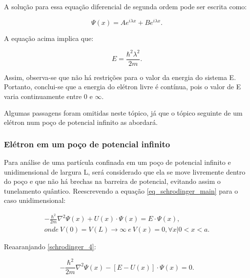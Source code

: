   \par A solução para essa equação diferencial de segunda ordem pode ser escrita como\cite{frustrado7}:

  \begin{equation}
    \label{schrodinger_2}
    \Psi(x) = Ae^{i\lambda x} + Be^{i\lambda x}  .
  \end{equation}

  \par A equação acima implica que:

  \begin{equation}
    \label{schrodinger_3}
    E = \frac{\hbar^2 \lambda^2}{2m}.
  \end{equation}

  \par Assim, observa-se que não há restrições para o valor da energia do sistema E. Portanto, conclui-se que a energia do elétron livre é contínua, pois o valor de E varia continuamente entre $0$ e $\infty$.

  \par Algumas passagens foram omitidas neste tópico, já que o tópico seguinte de um elétron num poço de potencial infinito as abordará. 

\subsubsection{Elétron em um poço de potencial infinito}

  \par Para análise de uma partícula confinada em um poço de potencial infinito e unidimensional de largura L, será considerado que ela se move livremente dentro do poço e que não há brechas na barreira de potencial, evitando assim o tunelamento quântico. Reescrevendo a equação \eqref{eq_schrodinger_main} para o caso unidimensional: 

  \begin{align}\label{schrodinger_4}
      -\frac{\hbar^2}{2m} \nabla^2 \Psi(x) + U(x) \cdot \Psi(x) = E \cdot \Psi(x),\\
      onde\ V(0)=V(L)\rightarrow \infty\ e\ V(x)=0,\forall x | 0<x<a.
  \end{align}

  \par Reaaranjando \eqref{schrodinger_4}:

  \begin{equation}\label{schrodinger_5}
    -\frac{\hbar^2}{2m} \nabla^2 \Psi(x) - [E - U(x)] \cdot \Psi(x) = 0.
  \end{equation}

